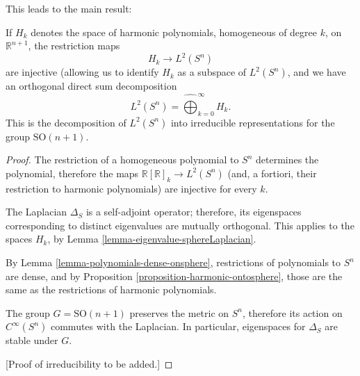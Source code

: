 This leads to the main result:
\begin{theorem}
 \label{theorem-sphericalharmonics}
If $H_k$ denotes the space of harmonic polynomials, homogeneous of degree $k$, on $\mathbb R^{n+1}$, the restriction maps
$$H_k \to L^2(S^n)$$
are injective (allowing us to identify $H_k$ as a subspace of $L^2(S^n)$, and we have an orthogonal direct sum decomposition 
$$ L^2(S^n) = \hat\bigoplus_{k=0}^\infty H_k.$$
This is the decomposition of $L^2(S^n)$ into irreducible representations for the group $\text{SO}(n+1)$.
\end{theorem}

\begin{proof}
 The restriction of a homogeneous polynomial to $S^n$ determines the polynomial, therefore the maps $\mathbb R[\mathbb R]_k \to L^2(S^n)$ (and, a fortiori, their restriction to harmonic polynomials) are injective for every $k$.
 
 The Laplacian $\Delta_S$ is a self-adjoint operator; therefore, its eigenspaces corresponding to distinct eigenvalues are mutually orthogonal. This applies to the spaces $H_k$, by Lemma \ref{lemma-eigenvalue-sphereLaplacian}.
 
 By Lemma  \ref{lemma-polynomials-dense-onsphere}, restrictions of polynomials to $S^n$ are dense, and by Proposition \ref{proposition-harmonic-ontosphere}, those are the same as the restrictions of harmonic polynomials.
 
 The group $G=\text{SO}(n+1)$ preserves the metric on $S^n$, therefore its action on $C^\infty(S^n)$ commutes with the Laplacian. In particular, eigenspaces for $\Delta_S$ are stable under $G$. 
 
 [Proof of irreducibility to be added.]
\end{proof}












